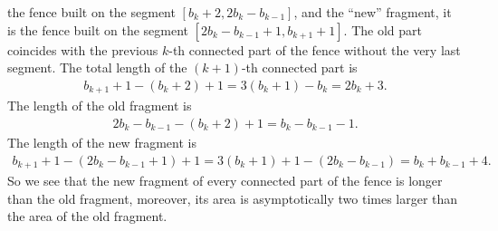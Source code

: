 \documentclass[pdftex]{sigma}
\numberwithin{equation}{section}
\begin{document}
the fence built on the segment $[b_k+2,2b_k-b_{k-1}]$, and the ``new'' fragment, it is the fence built on the segment
$[2b_k-b_{k-1}+1,b_{k+1}+1]$. The old part coincides with the previous $k$-th connected part of the fence without the very
last segment. The total length of the $(k+1)$-th connected part is
\begin{gather*}
b_{k+1}+1-(b_k+2)+1=3(b_{k}+1)-b_{k}=2b_{k}+3.
\end{gather*}
The length of the old fragment is
\begin{gather*}
2b_k-b_{k-1}-(b_k+2)+1=b_{k}-b_{k-1}-1.
\end{gather*}
The length of the new fragment is
\begin{gather*}
b_{k+1}+1-(2b_k-b_{k-1}+1)+1=3(b_{k}+1)+1-(2b_k-b_{k-1})=b_{k}+b_{k-1}+4.
\end{gather*}
So we see that the new fragment of every connected part of the fence is longer than the old fragment, moreover,
its area is asymptotically two times larger than the area of the old fragment.
\end{document}
